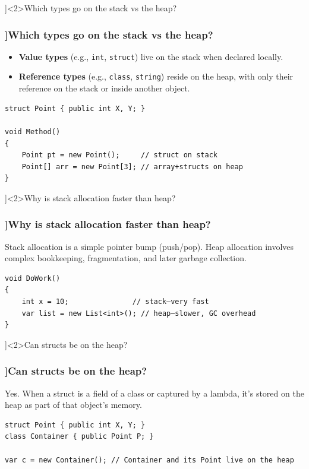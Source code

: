 \QuestionSlide[\CategoryBadge[MemoryColor!20]{Types \& Memory}]<2>{Which types go on the stack vs the heap?}
\begin{frame}[fragile]
  \frametitle{\AnswerTitle[\CategoryBadge[MemoryColor!20]{Types \& Memory}]{Which types go on the stack vs the heap?}}

  {\footnotesize
    \begin{itemize}
      \item \textbf{Value types} (e.g., \texttt{int}, \texttt{struct}) live on the stack when declared locally.
      \item \textbf{Reference types} (e.g., \texttt{class}, \texttt{string}) reside on the heap, with only their reference on the stack or inside another object.
    \end{itemize}
  }

  \begin{verbatim}
struct Point { public int X, Y; }

void Method()
{
    Point pt = new Point();     // struct on stack
    Point[] arr = new Point[3]; // array+structs on heap
}
  \end{verbatim}
\end{frame}

\QuestionSlide[\CategoryBadge[MemoryColor!20]{Types \& Memory}]<2>{Why is stack allocation faster than heap?}
\begin{frame}[fragile]
  \frametitle{\AnswerTitle[\CategoryBadge[MemoryColor!20]{Types \& Memory}]{Why is stack allocation faster than heap?}}

  {\footnotesize
    Stack allocation is a simple pointer bump (push/pop). Heap allocation involves complex bookkeeping, fragmentation, and later garbage collection.
  }

  \begin{verbatim}
void DoWork()
{
    int x = 10;               // stack—very fast
    var list = new List<int>(); // heap—slower, GC overhead
}
  \end{verbatim}
\end{frame}

\QuestionSlide[\CategoryBadge[MemoryColor!20]{Types \& Memory}]<2>{Can structs be on the heap?}
\begin{frame}[fragile]
  \frametitle{\AnswerTitle[\CategoryBadge[MemoryColor!20]{Types \& Memory}]{Can structs be on the heap?}}

  {\footnotesize
    Yes. When a struct is a field of a class or captured by a lambda, it’s stored on the heap as part of that object’s memory.
  }

  \begin{verbatim}
struct Point { public int X, Y; }
class Container { public Point P; }

var c = new Container(); // Container and its Point live on the heap
  \end{verbatim}
\end{frame}

